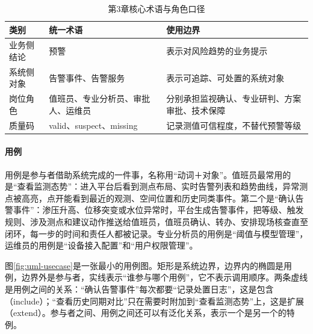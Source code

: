 \begin{table}[htbp]
\centering
\caption{第3章核心术语与角色口径}
\label{tab:ch03-terms}
\begin{tabular}{p{3.0cm}p{4.3cm}p{6.0cm}}
\toprule
类别 & 统一术语 & 使用边界 \\
\midrule
业务侧结论 & 预警 & 表示对风险趋势的业务提示 \\
系统侧对象 & 告警事件、告警服务 & 表示可追踪、可处置的系统对象 \\
岗位角色 & 值班员、专业分析员、审批人、运维员 & 分别承担监视确认、专业研判、方案审批、技术保障 \\
质量码 & valid、suspect、missing & 记录测值可信程度，不替代预警等级 \\
\bottomrule
\end{tabular}
\end{table}

\paragraph{用例}用例是参与者借助系统完成的一件事，名称用“动词＋对象”。值班员最常用的是“查看监测态势”：进入平台后看到测点布局、实时告警列表和趋势曲线，异常测点被高亮，点开能看到最近的观测、空间位置和历史同类事件。第二个是“确认告警事件”：渗压升高、位移突变或水位异常时，平台生成告警事件，把等级、触发规则、涉及测点和建议动作推送给值班员，值班员确认、转办、安排现场核查直至闭环，每一步的时间和责任人都被记录。专业分析员的用例是“阈值与模型管理”，运维员的用例是“设备接入配置”和“用户权限管理”。

图\ref{fig:uml-usecase}是一张最小的用例图。矩形是系统边界，边界内的椭圆是用例，边界外是参与者，实线表示“谁参与哪个用例”，它不表示调用顺序。两条虚线是用例之间的关系：“确认告警事件”每次都要“记录处置日志”，这是包含（include）；“查看历史同期对比”只在需要时附加到“查看监测态势”上，这是扩展（extend）。参与者之间、用例之间还可以有泛化关系，表示一个是另一个的特例。

